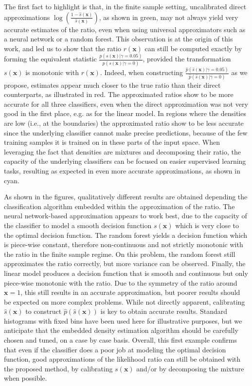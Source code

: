 \documentclass[12pt]{article}
\numberwithin{equation}{section}
\theoremstyle{plain}
\begin{document}
The first fact to highlight is that, in the finite sample setting, uncalibrated
direct approximations $\log \left( \frac{1 - \hat s(\mathbf{x})}{\hat
s(\mathbf{x})} \right)$, as shown in green, may not always yield very accurate
estimates of the ratio, even when using universal approximators such as a neural
network or a random forest. This observation is at the origin of this work, and
led us to show that the ratio $r(\mathbf{x})$ can still be computed exactly by
forming the equivalent statistic
$\frac{p(s(\mathbf{x})|\gamma=0.05)}{p(s(\mathbf{x})|\gamma=0)}$, provided the
transformation $s(\mathbf{x})$ is monotonic with $r(\mathbf{x})$. Indeed, when
constructing $\frac{\hat p(\hat s(\mathbf{x})|\gamma=0.05)}{\hat p(\hat
s(\mathbf{x})|\gamma=0)}$ as we propose, estimates appear much closer to the
true ratio than their direct counterparts, as illustrated in red. The
approximated ratios show to be more accurate for all three classifiers, even
when the direct approximation was not very good in the first place, e.g. as for the
linear model. In regions where the densities are low (i.e., at the
boundaries) the approximated ratio show to be less accurate since the underlying
classifier cannot make precise predictions, because of the few training samples
it is trained on in these parts of the input space. When leveraging the fact
that densities are mixtures and decomposing their ratio, the capacity of the
underlying classifiers can be focused on easier supervised learning tasks,
resulting as expected in even more accurate approximations, as shown in cyan.

As shown in the figures, qualitatively different results are obtained depending
the classification algorithm embedded within the approximation of the ratio. The
neural network-based approximation appears to work best, due to the capacity of
the classifier to model a smooth decision function $s(\mathbf{x})$ which is
very close to the optimal decision function. The random forest yields a decision function
which is piece-wise constant, therefore non-continuous and not strictly
monotonic with the ratio in the finite sample regime. On this problem, the
random forest still approximates the ratio correctly, but more variance can be
observed. Finally, the linear model produces a decision function that is
smooth and continuous but only piece-wise monotonic with the ratio. Due to the symmetry of
the ratio around $\mathbf{x}=1$, this still results in an accurate
approximation, but poorer results should be expected on more complex problems.
While not directly apparent, calibrating $\hat s(\mathbf{x})$ to construct $\hat p(\hat
s(\mathbf{x}))$ is key to obtain accurate results. Standard
histograms with fixed bins have been used here for illustrative purposes, but we
anticipate that the embedded density estimation algorithm should be carefully
chosen and tuned, on a case by case basis. Overall, this first example confirms
that even if the classifier does a poor job at modeling the optimal decision
function, good approximations of the likelihood ratio can still be obtained
with the proposed method, by calibrating $s(\mathbf{x})$ and/or by decomposing
the mixture when possible.
\end{document}
